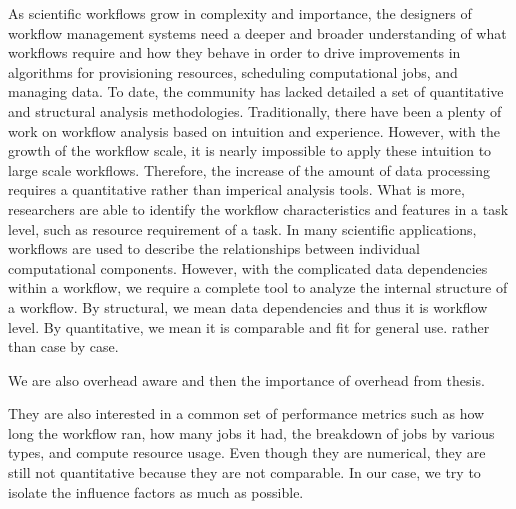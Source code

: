 \documentclass[final,5p,times,twocolumn]{elsarticle}
\begin{document}
As scientific workflows grow in complexity and importance, the designers of workflow management systems 
need a deeper and broader understanding of what workflows require and how they behave in order to drive 
improvements in algorithms for provisioning resources, scheduling computational jobs, and managing data. To 
date, the community has lacked detailed a set of quantitative and structural analysis methodologies. Traditionally, there have been a plenty of work on workflow analysis based on intuition and experience. However, with the growth of the workflow scale, it is nearly impossible to apply these intuition to large scale workflows. Therefore, the increase of the amount of data processing requires a quantitative rather than imperical analysis tools. What is more, researchers are able to identify the workflow characteristics and features in a task level, such as resource requirement of a task. In many scientific applications, workflows are used to describe the relationships between individual computational components. However, with the complicated data dependencies within a workflow, we require a complete tool to analyze the internal structure of a workflow. By structural, we mean data dependencies and thus it is workflow level. By quantitative, we mean it is comparable and fit for general use. rather than case by case. 

We are also overhead aware and then the importance of overhead from thesis. 

They are also interested in a common set of performance metrics such as how long the workflow ran, how many jobs it had, the breakdown of jobs by various types, and compute resource usage. Even though they are numerical, they are still not quantitative because they are not comparable. In our case, we try to isolate the influence factors as much as possible. 

\end{document}
